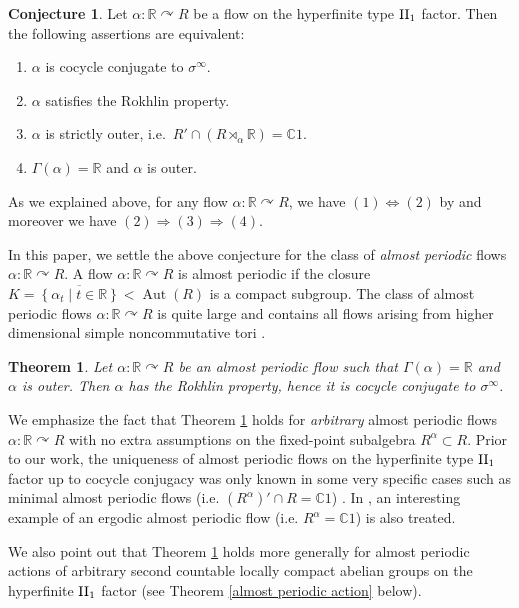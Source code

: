 \documentclass[a4paper,11pt]{amsart}
\numberwithin{equation}{section}
\newtheorem{letterthm}{Theorem}
\theoremstyle{definition}
\newtheorem*{conjecture}{Conjecture}
\newcommand{\R}{\mathbb{R}}
\newcommand{\C}{\mathbb{C}}
\newcommand{\Aut}{\operatorname{Aut}}
\newcommand{\II}{{\rm II}}
\begin{document}
\begin{conjecture}
Let $\alpha : \R \curvearrowright R$ be a flow on the hyperfinite type $\II_1$ factor. Then the following assertions are equivalent:
\begin{enumerate}
    \item $\alpha$ is cocycle conjugate to $\sigma^{\infty}$.
    \item $\alpha$ satisfies the Rokhlin property.
    \item $\alpha$ is strictly outer, i.e.\ $R' \cap (R \rtimes_\alpha \R)=\C1$.
    \item $\Gamma(\alpha) = \R$ and $\alpha$ is outer.
\end{enumerate}
\end{conjecture}
As we explained above, for any flow $\alpha : \R \curvearrowright R$, we have $(1) \Leftrightarrow (2)$ by \cite{MT12} and moreover we have $(2) \Rightarrow (3) \Rightarrow (4)$.

In this paper, we settle the above conjecture for the class of {\em almost periodic} flows $\alpha : \R \curvearrowright R$. A flow $\alpha : \R \curvearrowright R$ is almost periodic if the closure $K = \overline{\left\{\alpha_t \mid t \in \R \right\}} < \Aut(R)$ is a compact subgroup. The class of almost periodic flows $\alpha : \R \curvearrowright R$ is quite large and contains all flows arising from higher dimensional simple noncommutative tori \cite{Ki95, Ka88b}. 

\begin{letterthm} \label{main almost periodic flow}
Let $\alpha : \R \curvearrowright R$ be an almost periodic flow such that $\Gamma(\alpha) = \R$ and $\alpha$ is outer. Then $\alpha$ has the Rokhlin property, hence it is cocycle conjugate to $\sigma^\infty$.
 \end{letterthm}

We emphasize the fact that Theorem \ref{main almost periodic flow} holds for {\em arbitrary} almost periodic flows $\alpha : \R \curvearrowright R$ with no extra assumptions on the fixed-point subalgebra $R^\alpha \subset R$. Prior to our work, the uniqueness of almost periodic flows on the hyperfinite type $\II_1$ factor up to cocycle conjugacy was only known in some very specific cases such as minimal almost periodic flows (i.e.\! $(R^\alpha)' \cap R = \C1$) \cite[Theorem 6.12]{MT12}. In \cite{Ka88b}, an interesting example of an ergodic almost periodic flow (i.e.\! $R^\alpha = \C1$) is also treated.

We also point out that Theorem \ref{main almost periodic flow} holds more generally for almost periodic actions of arbitrary second countable locally compact abelian groups on the hyperfinite $\II_1$ factor (see Theorem \ref{almost periodic action} below).
\end{document}
